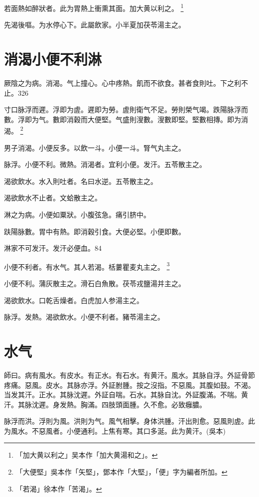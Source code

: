 \documentclass[b5paper,twoside,zihao=-4,UTF8]{ctexbook}
\begin{document}
若面熱如醉{狀者}。此为胃熱上衝熏其面。加大黄以利之。
	\footnote{「加大黄以利之」吴本作「加大黄湯和之」。}

先渴後嘔。为水停心下。此屬飲家。小半夏{加}茯苓湯主之。

\chapter{消渴小便{不}利淋}

厥陰之为病。消渴。气上撞{心}。心中疼熱。飢而不欲食。{甚者}食則吐。下之利不止。326

寸口脉浮而遲。浮即为虗。遲即为勞。虗則衛气不足。勞則榮气竭。跌陽脉浮而數。浮即为气。數即消穀而大{便}堅。气盛則溲數。溲數即堅。堅數相摶。即为消渴。
	\footnote{「大便堅」吳本作「矢堅」，鄧本作「大堅」，「便」字为編者所加。}

男子消渴。小便反多。以飲一斗。小便一斗。腎气丸主之。

脉浮。小便不利。微熱。消渴者。宜利小便。发汗。五苓散主之。

渴欲飲水。水入則吐者。名曰水逆。五苓散主之。

渴欲飲水不止者。文蛤散主之。

淋之为病。小便如粟狀。小腹弦急。痛引脐中。

趺陽脉數。胃中有熱。即消穀引食。大便必堅。小便即數。

淋家不可发汗。发汗必便血。84

小便不利者。有水气。其人若渴。栝蔞瞿麦丸主之。
	\footnote{「若渴」徐本作「苦渴」。}

小便不利。蒲灰散主之。滑石白魚散。茯苓戎鹽湯并主之。

渴欲飲水。口乾舌燥者。白虎加人参湯主之。

脉浮。发熱。渴欲飲水。小便不利者。豬苓湯主之。

\chapter{水气}

師曰。病有風水。有皮水。有正水。有石水。有黄汗。風水。其脉自浮。外証骨節疼痛。惡風。皮水。其脉亦浮。外証胕腫。按之沒指。不惡風。其腹如鼓。不渴。当发其汗。正水。其脉沈遲。外証自喘。石水。其脉自沈。外証腹滿。不喘。黄汗。其脉沈遲。身发熱。胸滿。四肢頭面腫。久不愈。必致癰膿。

脉浮而洪。浮則为風。洪則为气。風气相擊。身体洪腫。汗出則愈。惡風則虗。此为風水。不惡風者。小便通利。上焦有寒。其口多涎。此为黄汗。(吳本)
\end{document}
